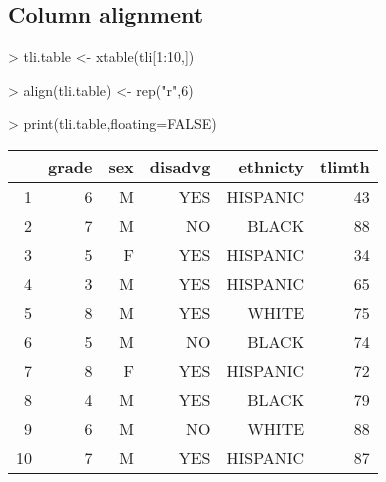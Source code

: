 \documentclass[letterpaper]{article}
\begin{document}
\subsection{Column alignment}

\begin{Schunk}
\begin{Sinput}
> tli.table <- xtable(tli[1:10,])
\end{Sinput}
\end{Schunk}
\begin{Schunk}
\begin{Sinput}
> align(tli.table) <- rep("r",6)
\end{Sinput}
\end{Schunk}
\begin{Schunk}
\begin{Sinput}
> print(tli.table,floating=FALSE)
\end{Sinput}
% latex table generated in R 3.1.1 by xtable 1.7-3 package
% 
\begin{tabular}{rrrrrr}
  \hline
 & grade & sex & disadvg & ethnicty & tlimth \\ 
  \hline
1 &   6 & M & YES & HISPANIC &  43 \\ 
  2 &   7 & M & NO & BLACK &  88 \\ 
  3 &   5 & F & YES & HISPANIC &  34 \\ 
  4 &   3 & M & YES & HISPANIC &  65 \\ 
  5 &   8 & M & YES & WHITE &  75 \\ 
  6 &   5 & M & NO & BLACK &  74 \\ 
  7 &   8 & F & YES & HISPANIC &  72 \\ 
  8 &   4 & M & YES & BLACK &  79 \\ 
  9 &   6 & M & NO & WHITE &  88 \\ 
  10 &   7 & M & YES & HISPANIC &  87 \\ 
   \hline
\end{tabular}\end{Schunk}
\end{document}
